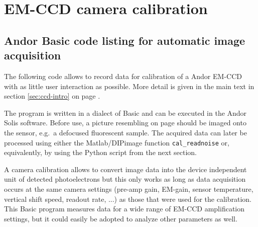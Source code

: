 \chapter{EM-CCD camera calibration}
\section{Andor Basic code listing for automatic image acquisition}
\label{sec:basic-acquisition}


The following code allows to record data for calibration of a Andor
EM-CCD with as little user interaction as possible. More detail is
given in the main text in section \ref{sec:ccd-intro} on page
\pageref{sec:ccd-intro}.

The program is written in a dialect of Basic and can be executed in
the Andor Solis software. Before use, a picture resembling
 on page \pageref{fig:shot-noise} should be
imaged onto the sensor, e.g.\ a defocused fluorescent sample. The
acquired data can later be processed using either the Matlab/DIPimage
function \verb!cal_readnoise! or, equivalently, by using the Python
script from the next section.

A camera calibration allows to convert image data into the device
independent unit of detected photoelectrons but this only works as
long as data acquisition occurs at the same camera settings (pre-amp
gain, EM-gain, sensor temperature, vertical shift speed, readout rate,
...) as those that were used for the calibration. This Basic program
measures data for a wide range of EM-CCD amplification settings, but
it could easily be adopted to analyze other parameters as well.

